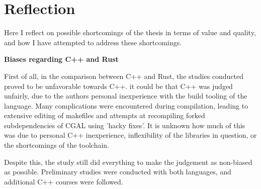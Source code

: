 






\section{Reflection}
\label{sec:reflection}

Here I reflect on possible shortcomings of the thesis in terms of value and quality, and how I have attempted to address these shortcomings. 

\textbf{Biases regarding C++ and Rust}

First of all, in the comparison between C++ and Rust, the studies conducted proved to be unfavorable towards C++. 
it could be that C++ was judged unfairly, due to the authors personal inexperience with the build tooling of the language. 
Many complications were encountered during compilation, leading to extensive editing of makefiles and attempts at recompiling forked subdependencies of CGAL using 'hacky fixes'.  
It is unknown how much of this was due to personal C++ inexperience, inflexibility of the libraries in question, or the shortcomings of the toolchain. 

Despite this, the study still did everything to make the judgement as non-biased as possible.
Preliminary studies were conducted with both languages, and additional C++ courses were followed. 

